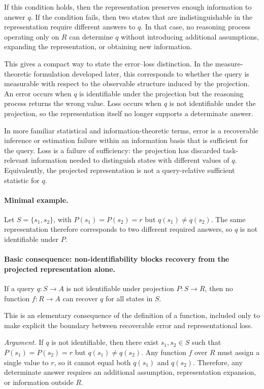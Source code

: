\documentclass[11pt]{article}
\begin{document}
If this condition holds, then the representation preserves enough information to answer $q$. If the condition fails, then two states that are indistinguishable in the representation require different answers to $q$. In that case, no reasoning process operating only on $R$ can determine $q$ without introducing additional assumptions, expanding the representation, or obtaining new information.

This gives a compact way to state the error--loss distinction. In the measure-theoretic formulation developed later, this corresponds to whether the query is measurable with respect to the observable structure induced by the projection. An error occurs when $q$ is identifiable under the projection but the reasoning process returns the wrong value. Loss occurs when $q$ is not identifiable under the projection, so the representation itself no longer supports a determinate answer.

In more familiar statistical and information-theoretic terms, error is a recoverable inference or estimation failure within an information basis that is sufficient for the query. Loss is a failure of sufficiency: the projection has discarded task-relevant information needed to distinguish states with different values of $q$. Equivalently, the projected representation is not a query-relative sufficient statistic for $q$.

\paragraph{Minimal example.}
Let \(S=\{s_1,s_2\}\), with \(P(s_1)=P(s_2)=r\) but \(q(s_1)\neq q(s_2)\). The same representation therefore corresponds to two different required answers, so \(q\) is not identifiable under \(P\).

\paragraph{Basic consequence: non-identifiability blocks recovery from the projected representation alone.}
If a query $q:S\rightarrow A$ is not identifiable under projection $P:S\rightarrow R$, then no function $f:R\rightarrow A$ can recover $q$ for all states in $S$.

This is an elementary consequence of the definition of a function, included only to make explicit the boundary between recoverable error and representational loss.

\emph{Argument.}
If $q$ is not identifiable, then there exist $s_1,s_2\in S$ such that $P(s_1)=P(s_2)=r$ but $q(s_1)\neq q(s_2)$. Any function $f$ over $R$ must assign a single value to $r$, so it cannot equal both $q(s_1)$ and $q(s_2)$. Therefore, any determinate answer requires an additional assumption, representation expansion, or information outside $R$.
\end{document}
